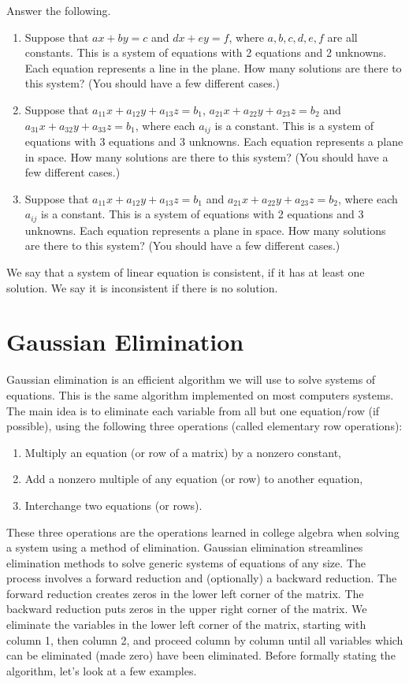 \begin{problem}
Answer the following.
\begin{enumerate}
 \item Suppose that $ax+by=c$ and $dx+ey=f$, where $a,b,c,d,e,f$ are all constants.  This is a system of equations with 2 equations and 2 unknowns.  Each equation represents a line in the plane.  How many solutions are there to this system?  (You should have a few different cases.)
 \item Suppose that $a_{11}x+a_{12}y+a_{13}z=b_1$, $a_{21}x+a_{22}y+a_{23}z=b_2$ and $a_{31}x+a_{32}y+a_{33}z=b_1$, where each $a_{ij}$ is a constant. This is a system of equations with 3 equations and 3 unknowns.  Each equation represents a plane in space.  How many solutions are there to this system?  (You should have a few different cases.)
 \item Suppose that $a_{11}x+a_{12}y+a_{13}z=b_1$ and $a_{21}x+a_{22}y+a_{23}z=b_2$, where each $a_{ij}$ is a constant. This is a system of equations with 2 equations and 3 unknowns.  Each equation represents a plane in space.  How many solutions are there to this system?  (You should have a few different cases.)
\end{enumerate}
\end{problem}

\begin{definition}
 We say that a system of linear equation is consistent, if it has at least one solution.  We say it is inconsistent if there is no solution. 
\end{definition}

\section{Gaussian Elimination}
Gaussian elimination is an efficient algorithm we will use to solve systems of equations. This is the same algorithm implemented on most computers systems. The main idea is to eliminate each variable from all but one equation/row (if possible), using the following three operations (called elementary row operations):
\begin{enumerate}
  \item Multiply an equation (or row of a matrix) by a nonzero constant,
  \item Add a nonzero multiple of any equation (or row) to another equation,
  \item Interchange two equations (or rows).
\end{enumerate}
These three operations are the operations learned in college algebra when solving a system using a method of elimination.  Gaussian elimination streamlines elimination methods to solve generic systems of equations of any size. The process involves a forward reduction and (optionally) a backward reduction. The forward reduction creates zeros in the lower left corner of the matrix.  The backward reduction puts zeros in the upper right corner of the matrix. We eliminate the variables in the lower left corner of the matrix, starting with column 1, then column 2, and proceed column by column until all variables which can be eliminated (made zero) have been eliminated. Before formally stating the algorithm, let's look at a few examples. 

